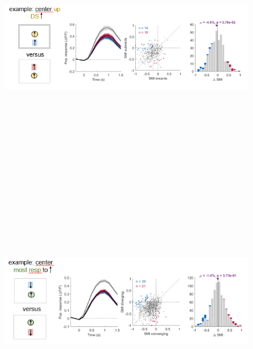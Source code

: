 \begin{figure}[H] \centering \includegraphics[width=11cm,height=11cm,keepaspectratio]{Figures/7.Results/finalPopulation/sel/diagrams/20.png} 
\end{figure}

\begin{figure}[H] \centering \includegraphics[width=11cm,height=11cm,keepaspectratio]{Figures/7.Results/finalPopulation/sel/diagrams/21.png} 
\end{figure}

